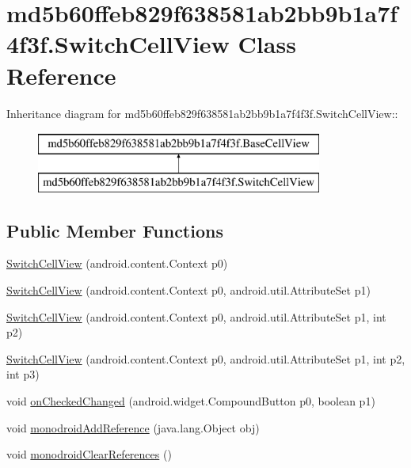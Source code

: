\hypertarget{classmd5b60ffeb829f638581ab2bb9b1a7f4f3f_1_1_switch_cell_view}{
\section{md5b60ffeb829f638581ab2bb9b1a7f4f3f.SwitchCellView Class Reference}
\label{classmd5b60ffeb829f638581ab2bb9b1a7f4f3f_1_1_switch_cell_view}
}
Inheritance diagram for md5b60ffeb829f638581ab2bb9b1a7f4f3f.SwitchCellView::\begin{figure}[H]
\begin{center}
\leavevmode
\includegraphics[height=2cm]{classmd5b60ffeb829f638581ab2bb9b1a7f4f3f_1_1_switch_cell_view}
\end{center}
\end{figure}
\subsection*{Public Member Functions}
\begin{CompactItemize}
\item 
\hyperlink{classmd5b60ffeb829f638581ab2bb9b1a7f4f3f_1_1_switch_cell_view_1a542bccac4c26b5a04b987ac7471b91}{SwitchCellView} (android.content.Context p0)
\item 
\hyperlink{classmd5b60ffeb829f638581ab2bb9b1a7f4f3f_1_1_switch_cell_view_c3d2a947e764c684c9a5dad1a993e526}{SwitchCellView} (android.content.Context p0, android.util.AttributeSet p1)
\item 
\hyperlink{classmd5b60ffeb829f638581ab2bb9b1a7f4f3f_1_1_switch_cell_view_58a93fdb9b3b35555b2772e70d41d644}{SwitchCellView} (android.content.Context p0, android.util.AttributeSet p1, int p2)
\item 
\hyperlink{classmd5b60ffeb829f638581ab2bb9b1a7f4f3f_1_1_switch_cell_view_674a5161d17501317efdded62c49a489}{SwitchCellView} (android.content.Context p0, android.util.AttributeSet p1, int p2, int p3)
\item 
void \hyperlink{classmd5b60ffeb829f638581ab2bb9b1a7f4f3f_1_1_switch_cell_view_a03e11d93abb9b4b5c3b933f310b2a1e}{onCheckedChanged} (android.widget.CompoundButton p0, boolean p1)
\item 
void \hyperlink{classmd5b60ffeb829f638581ab2bb9b1a7f4f3f_1_1_switch_cell_view_6526a7d8e09d4f580f9ba2058b1a31b7}{monodroidAddReference} (java.lang.Object obj)
\item 
void \hyperlink{classmd5b60ffeb829f638581ab2bb9b1a7f4f3f_1_1_switch_cell_view_c5c13d6e582a1a4005ce2de3fba31e9e}{monodroidClearReferences} ()
\end{CompactItemize}
